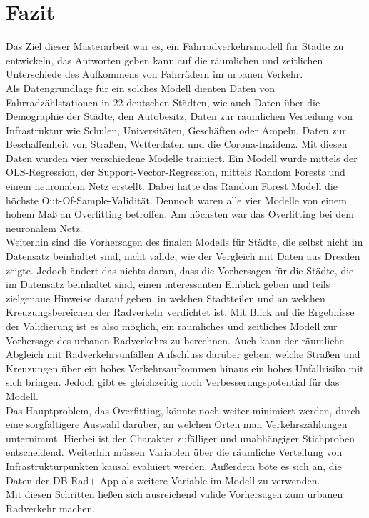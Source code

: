 \documentclass[a4paper,12pt]{thesis}
\begin{document}
\section{Fazit}

Das Ziel dieser Masterarbeit war es, ein Fahrradverkehrsmodell für Städte zu entwickeln, das Antworten geben kann auf die räumlichen und zeitlichen Unterschiede des Aufkommens von Fahrrädern im urbanen Verkehr.\\
Als Datengrundlage für ein solches Modell dienten Daten von Fahrradzählstationen in 22 deutschen Städten, wie auch Daten über die Demographie der Städte, den Autobesitz, Daten zur räumlichen Verteilung von Infrastruktur wie Schulen, Universitäten, Geschäften oder Ampeln, Daten zur Beschaffenheit von Straßen, Wetterdaten und die Corona-Inzidenz. Mit diesen Daten wurden vier verschiedene Modelle trainiert. Ein Modell wurde mittels der OLS-Regression, der Support-Vector-Regression, mittels Random Forests und einem neuronalem Netz erstellt. Dabei hatte das Random Forest Modell die höchste Out-Of-Sample-Validität. Dennoch waren alle vier Modelle von einem hohem Maß an Overfitting betroffen. Am höchsten war das Overfitting bei dem neuronalem Netz.\\
Weiterhin sind die Vorhersagen des finalen Modells für Städte, die selbst nicht im Datensatz beinhaltet sind, nicht valide, wie der Vergleich mit Daten aus Dresden zeigte. Jedoch ändert das nichts daran, dass die Vorhersagen für die Städte, die im Datensatz beinhaltet sind, einen interessanten Einblick geben und teils zielgenaue Hinweise darauf geben, in welchen Stadtteilen und an welchen Kreuzungsbereichen der Radverkehr verdichtet ist. Mit Blick auf die Ergebnisse der Validierung ist es also möglich, ein räumliches und zeitliches Modell zur Vorhersage des urbanen Radverkehrs zu berechnen. Auch kann der räumliche Abgleich mit Radverkehrsunfällen Aufschluss darüber geben, welche Straßen und Kreuzungen über ein hohes Verkehrsaufkommen hinaus ein hohes Unfallrisiko mit sich bringen. Jedoch gibt es gleichzeitig noch Verbesserungspotential für das Modell.\\
Das Hauptproblem, das Overfitting, könnte noch weiter minimiert werden, durch eine sorgfältigere Auswahl darüber, an welchen Orten man Verkehrszählungen unternimmt. Hierbei ist der Charakter zufälliger und unabhängiger Stichproben entscheidend. Weiterhin müssen Variablen über die räumliche Verteilung von Infrastrukturpunkten kausal evaluiert werden. Außerdem böte es sich an, die Daten der DB Rad+ App als weitere Variable im Modell zu verwenden.\\
Mit diesen Schritten ließen sich ausreichend valide Vorhersagen zum urbanen Radverkehr machen.
\end{document}
